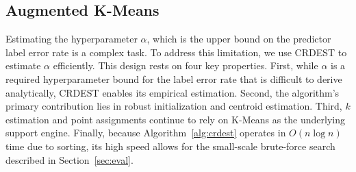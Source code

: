 \subsection{Augmented K-Means}
\label{app:aug}







  \noindent Estimating the hyperparameter $\alpha$, which is the upper bound on the predictor label error rate is a complex task. To address this limitation, we use CRDEST to estimate $\alpha$ efficiently. This design rests on four key properties. First, while $\alpha$ is a required hyperparameter bound for the label error rate that is difficult to derive analytically, CRDEST enables its empirical estimation. Second, the algorithm's primary contribution lies in robust initialization and centroid estimation. Third, $k$ estimation and point assignments continue to rely on K-Means as the underlying support engine. Finally, because Algorithm~\ref{alg:crdest} operates in $O(n \log n)$ time due to sorting, its high speed allows for the small-scale brute-force search described in Section~\ref{sec:eval}.


